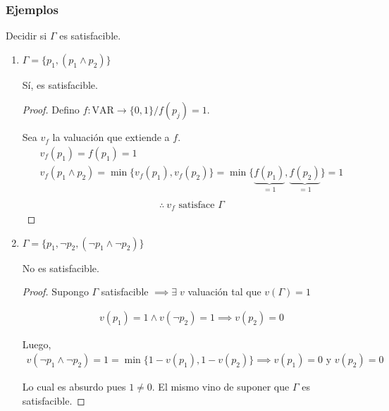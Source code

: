 \subsubsection{Ejemplos}

Decidir si $\Gamma$ es satisfacible.

\begin{enumerate}
    \item $\Gamma = \{ p_1, (p_1 \wedge p_2) \}$

        Sí, es satisfacible.

        \begin{proof} \phantom{.}

        Defino $f:\mathrm{VAR}\to \{ 0,1 \} / f(p_j)=1$. 

        Sea $v_f$ la valuación que extiende a $f$.
        \begin{gather*}
            v_f(p_1) = f(p_1) = 1 \\
            v_f(p_1 \wedge p_2) = \min \{ v_f (p_1), v_f(p_2) \} =
            \min \{\underbrace{f(p_1)}_{=1}, \underbrace{f(p_2)}_{=1}\} = 1 \\
        \end{gather*}
        \begin{gather*}
            \boxed{\therefore ~ v_f \text{ satisface } \Gamma}
        \end{gather*}

        \end{proof}

    \item $\Gamma = \{ p_1, \neg p_2, (\neg p_1 \wedge \neg p_2) \}$

        No es satisfacible.

        \begin{proof} \phantom{.}

        Supongo $\Gamma$ satisfacible $\implies \exists \; v$ valuación tal
        que $v(\Gamma)=1$

        \begin{gather*}
            v(p_1) = 1 \wedge v(\neg p_2) = 1
            \implies v(p_2)=0
        \end{gather*}

        Luego,
        \begin{gather*}
            v(\neg p_1 \wedge \neg p_2) = 1 = \min \{ 1-v(p_1),1-v(p_2) \}
            \implies v(p_1)=0 \text{ y } v(p_2)=0
        \end{gather*}

        Lo cual es absurdo pues $1 \neq 0$. El mismo vino de suponer que 
        $\Gamma$ es satisfacible.


\end{proof}
\end{enumerate}
